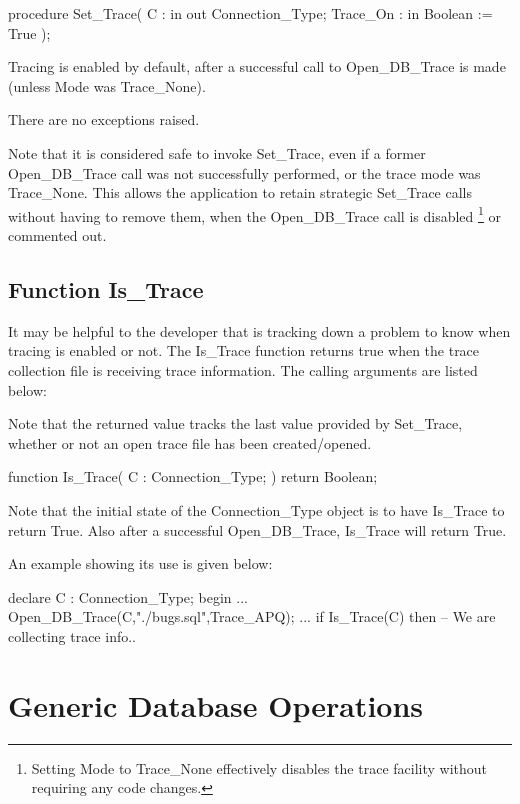 \documentclass[english,letterpaper]{book}
\begin{document}
\begin{Code}
procedure Set_Trace(
   C :        in out Connection_Type;
   Trace_On : in     Boolean := True
);
\end{Code}

Tracing is enabled by default, after a successful call to Open\_DB\_Trace
is made (unless Mode was Trace\_None).

There are no exceptions raised.

Note that it is considered safe to invoke Set\_Trace, even if a former
Open\_DB\_Trace call was not successfully performed, or the trace
mode was Trace\_None. This allows the application to retain strategic
Set\_Trace calls without having to remove them, when the Open\_DB\_Trace
call is disabled%
\footnote{Setting Mode to Trace\_None effectively disables the trace facility
without requiring any code changes.%
} or commented out.


\subsection{Function Is\_Trace}

It may be helpful to the developer that is tracking down a problem
to know when tracing is enabled or not. The Is\_Trace function returns
true when the trace collection file is receiving trace information.
The calling arguments are listed below:%

Note that the returned value tracks the last value provided by
Set\_Trace, whether or not an open trace file has been created/opened.

\begin{Code}
function Is_Trace(
   C : Connection_Type;
) return Boolean;
\end{Code}

Note that the initial state of the Connection\_Type object is to have
Is\_Trace to return True. Also after a successful Open\_DB\_Trace,
Is\_Trace will return True.

An example showing its use is given below:

\begin{Example}
declare
   C : Connection_Type;
begin
   ...
   Open_DB_Trace(C,"./bugs.sql",Trace_APQ);
   ...
   if Is_Trace(C) then
      -- We are collecting trace info..
\end{Example}

\section{Generic Database Operations}
\end{document}
